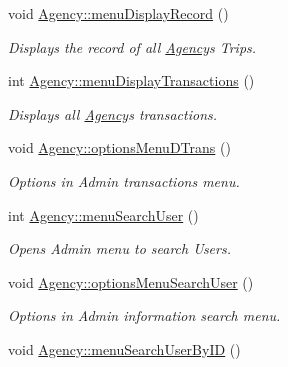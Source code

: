\begin{DoxyCompactItemize}
void \hyperlink{group___agency_gae4890fb51527fa95db0e22780f867ecf}{Agency\+::menu\+Display\+Record} ()
\begin{DoxyCompactList}\small\item\em Displays the record of all \hyperlink{class_agency}{Agency}\textquotesingle{}s Trips. \end{DoxyCompactList}\item 
\mbox{\label{group___agency_ga2c99075b9ec8cb23e2e7974dba44161d}} 
int \hyperlink{group___agency_ga2c99075b9ec8cb23e2e7974dba44161d}{Agency\+::menu\+Display\+Transactions} ()
\begin{DoxyCompactList}\small\item\em Displays all \hyperlink{class_agency}{Agency}\textquotesingle{}s transactions. \end{DoxyCompactList}\item 
\mbox{\label{group___agency_gae7adf6319525f61d71e1ec46c2fb3659}} 
void \hyperlink{group___agency_gae7adf6319525f61d71e1ec46c2fb3659}{Agency\+::options\+Menu\+D\+Trans} ()
\begin{DoxyCompactList}\small\item\em Options in Admin transactions menu. \end{DoxyCompactList}\item 
\mbox{\label{group___agency_gac3966e479d0ff814b7811edcaa6ea449}} 
int \hyperlink{group___agency_gac3966e479d0ff814b7811edcaa6ea449}{Agency\+::menu\+Search\+User} ()
\begin{DoxyCompactList}\small\item\em Opens Admin menu to search Users. \end{DoxyCompactList}\item 
\mbox{\label{group___agency_ga15abca6e47057fac90682e8b0317322c}} 
void \hyperlink{group___agency_ga15abca6e47057fac90682e8b0317322c}{Agency\+::options\+Menu\+Search\+User} ()
\begin{DoxyCompactList}\small\item\em Options in Admin information search menu. \end{DoxyCompactList}\item 
\mbox{\label{group___agency_gaf2c7b19ae6f03a1454b5a36c2343119a}} 
void \hyperlink{group___agency_gaf2c7b19ae6f03a1454b5a36c2343119a}{Agency\+::menu\+Search\+User\+By\+ID} ()

\end{DoxyCompactItemize}
